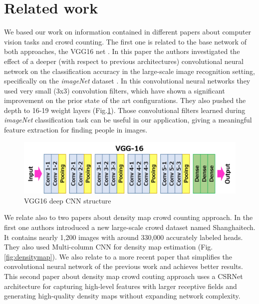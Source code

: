 \documentclass[10pt,twocolumn,letterpaper]{article}
\begin{document}
\section{Related work}

We based our work on information contained in different papers about computer vision tasks and crowd counting. The first one is related to the base network of both approaches, the VGG16 net \cite{simonyan2014very}. In this paper the authors investigated the effect of a deeper (with respect to previous architectures) convolutional neural network on the classification accuracy in the
large-scale image recognition setting, specifically on the \textit{imageNet} dataset \cite{deng2009imagenet}. In this convolutional neural networks they used very small (3x3) convolution filters, which have shown a significant improvement on the prior state of the art configurations. They also pushed the depth to 16-19 weight layers (Fig.\ref{fig:vgg16}). Those convolutional filters learned during \textit{imageNet} classification task can be useful in our application, giving a meaningful feature extraction for finding people in images.

\begin{figure}[h!]
  \includegraphics[width=\linewidth]{pics/vgg16.png}
  \caption{VGG16 deep CNN structure}
  \label{fig:vgg16}
\end{figure}

We relate also to two papers about density map crowd counting approach. In the first one \cite{zhang2016single} authors introduced a new large-scale crowd dataset named Shanghaitech. It contains nearly 1,200 images with around 330,000 accurately labeled heads. They also used Multi-column CNN for density map estimation (Fig.\ref{fig:densitymap}). We also relate to a more recent paper that simplifies the convolutional neural network of the previous work and achieves better results. This second paper about density map crowd couting approach \cite{li2018csrnet} uses a CSRNet architecture for capturing high-level features with
larger receptive fields and generating high-quality density maps without expanding network complexity. 
\end{document}
